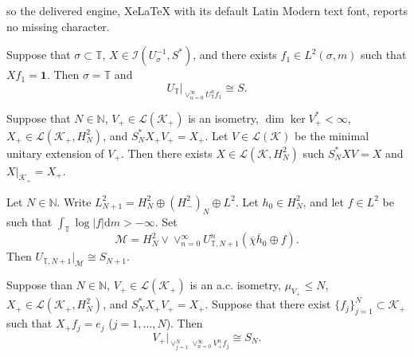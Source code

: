 \documentclass[10pt,a4paper]{amsart}
\begin{document}
so the delivered engine, XeLaTeX with its default Latin Modern text font, reports no missing character.
\begin{lemma} \label{lem11}Suppose that $\sigma\subset\mathbb T$, $X\in\mathcal I(U_\sigma^{-1}, S^*)$, and there exists 
 $f_1\in L^2(\sigma,m)$   such that $Xf_1=\mathbf{1}$.
 Then $\sigma=\mathbb T$ 
and \begin{equation*} U_{\mathbb T}|_{\vee_{n=0}^\infty U_{\mathbb T}^n f_1}\cong S.\end{equation*}
\end{lemma}

\begin{lemma} \label{lem12} Suppose that $N\in\mathbb N$,
  $V_+\in\mathcal L(\mathcal K_+)$ is an isometry, $\dim\ker V_+^*<\infty$, 
 $X_+\in\mathcal L(\mathcal K_+, H_N^2)$, and $S_N^*X_+V_+=X_+$.
 Let $V\in\mathcal L(\mathcal K)$ be the minimal unitary extension of $V_+$.
Then there exists $X\in\mathcal L(\mathcal K, H_N^2)$ such  $S_N^*XV=X$ and 
$X|_{\mathcal K_+}=X_+$.
\end{lemma}

\begin{lemma}\label{lem13} Let $N\in\mathbb N$. Write $L^2_{N+1}=H^2_N\oplus (H^2_-)_N\oplus L^2$. 
Let $h_0\in H^2_N$, and let $f\in L^2$ be such that $\int_{\mathbb T}\log|f|\mathrm{d}m>-\infty$. 
Set \begin{equation*}
\mathcal M=H^2_N\vee\vee_{n=0}^\infty U_{\mathbb T, N+1}^n(\overline\chi\overline h_0\oplus f).
\end{equation*}
Then  $U_{\mathbb T, N+1}|_{\mathcal M}\cong S_{N+1}$.
\end{lemma}

\begin{theorem} \label {thmmainiso}Suppose than $N\in\mathbb N$, $V_+\in\mathcal L(\mathcal K_+)$ is an a.c. isometry, 
$\mu_{V_+}\leq N$, 
$X_+\in\mathcal L(\mathcal K_+, H^2_N)$, and $S_N^*X_+V_+=X_+$. Suppose that there exist
 $\{f_j\}_{j=1}^N\subset\mathcal K_+$
such that $X_+f_j=e_j$ ($j=1,\ldots, N$). Then \begin{equation*}V_+|_{\vee_{j=1}^N\vee_{n=0}^\infty V_+^n f_j}\cong S_N.\end{equation*}
\end{theorem}
\end{document}
